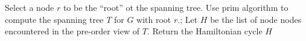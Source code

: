 \documentclass{subfiles}
\begin{document}
    \begin{procedure}
        \caption{Approximate-TSP($G, c$)}\label{proc:approx-tsp}
        \nl Select a node $r$ to be the ``root'' ot the spanning tree.\DontPrintSemicolon\;
        \nl Use prim algorithm to compute the spanning tree $T$ for $G$ with root $r$.;\DontPrintSemicolon\;
        \nl Let $H$ be the list of node nodes encountered in the pre-order view of $T$.\DontPrintSemicolon\;
        \nl Return the Hamiltonian cycle $H$
    \end{procedure}
\end{document}

